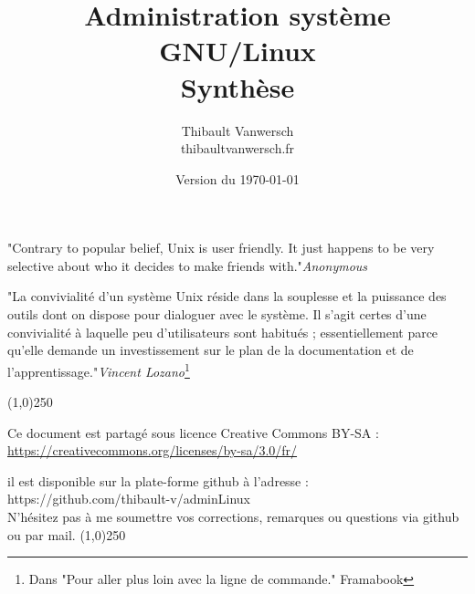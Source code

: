 \documentclass[a4paper,11pt]{article}
\title{Administration système GNU/Linux\\Synthèse}
\author{
    Thibault Vanwersch \\
    thibault\at vanwersch.fr
}
\date{Version du \today}
\begin{document}
\maketitle
\par{"Contrary to popular belief, Unix is user friendly. It just happens to be very selective about who it decides to make friends with."\hfill\emph{Anonymous}}

\par{"La convivialité d'un système Unix réside dans la souplesse et la puissance des outils dont on dispose pour dialoguer avec le système. Il s'agit certes d'une convivialité à laquelle peu d'utilisateurs sont habitués ; essentiellement parce qu'elle demande un investissement sur le plan de la documentation et de l'apprentissage."\hfill\emph{Vincent Lozano}\footnote{Dans "Pour aller plus loin avec la ligne de commande." Framabook}}

\begin{center}
\line(1,0){250}
\par Ce document est partagé sous licence Creative Commons BY-SA :\\
\url{https://creativecommons.org/licenses/by-sa/3.0/fr/}
\par il est disponible sur la plate-forme github à l'adresse :\\
https://github.com/thibault-v/adminLinux \\
N'hésitez pas à me soumettre vos corrections, remarques ou questions via github ou par mail.
\line(1,0){250}
\end{center}
\end{document}
